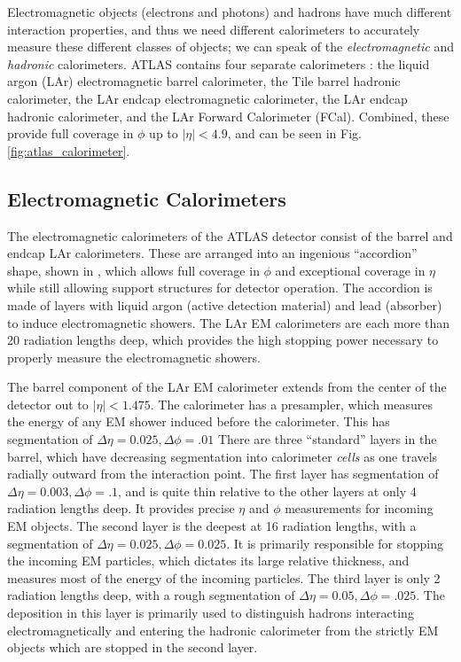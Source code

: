 Electromagnetic objects (electrons and photons) and hadrons have much different interaction properties, and thus we need different calorimeters to accurately measure these different classes of objects; we can speak of the \textit{electromagnetic} and \textit{hadronic} calorimeters.
ATLAS contains four separate calorimeters : the liquid argon (LAr) electromagnetic barrel calorimeter, the Tile barrel hadronic calorimeter, the LAr endcap electromagnetic calorimeter, the LAr endcap hadronic calorimeter, and the LAr Forward Calorimeter (FCal).
Combined, these provide full coverage in $\phi$ up to $|\eta| <4.9$, and can be seen in Fig.\ref{fig:atlas_calorimeter}.

\subsection{Electromagnetic Calorimeters}

The electromagnetic calorimeters of the ATLAS detector consist of the barrel and endcap LAr calorimeters.
These are arranged into an ingenious ``accordion'' shape, shown in , which allows full coverage in $\phi$ and exceptional coverage in $\eta$ while still allowing support structures for detector operation.
The accordion is made of layers with liquid argon (active detection material) and lead (absorber) to induce electromagnetic showers.
The LAr EM calorimeters are each more than 20 radiation lengths deep, which provides the high stopping power necessary to properly measure the electromagnetic showers.

The barrel component of the LAr EM calorimeter extends from the center of the detector out to $| \eta| <  1.475 $.
The calorimeter has a presampler, which measures the energy of any EM shower induced before the calorimeter.
This has segmentation of $\Delta\eta = 0.025, \Delta\phi = .01$
There are three ``standard'' layers in the barrel, which have decreasing segmentation into calorimeter \textit{cells} as one travels radially outward from the interaction point.
The first layer has segmentation of $\Delta\eta = 0.003, \Delta\phi = .1$, and is quite thin relative to the other layers at only 4 radiation lengths deep.
It provides precise $\eta$ and $\phi$ measurements for incoming EM objects.
The second layer is the deepest at 16 radiation lengths, with a segmentation of $\Delta\eta = 0.025, \Delta\phi = 0.025$.
It is primarily responsible for stopping the incoming EM particles, which dictates its large relative thickness, and measures most of the energy of the incoming particles.
The third layer is only 2 radiation lengths deep, with a rough segmentation of $\Delta\eta = 0.05, \Delta\phi = .025$.
The deposition in this layer is primarily used to distinguish hadrons interacting electromagnetically and entering the hadronic calorimeter from the strictly EM objects which are stopped in the second layer.

